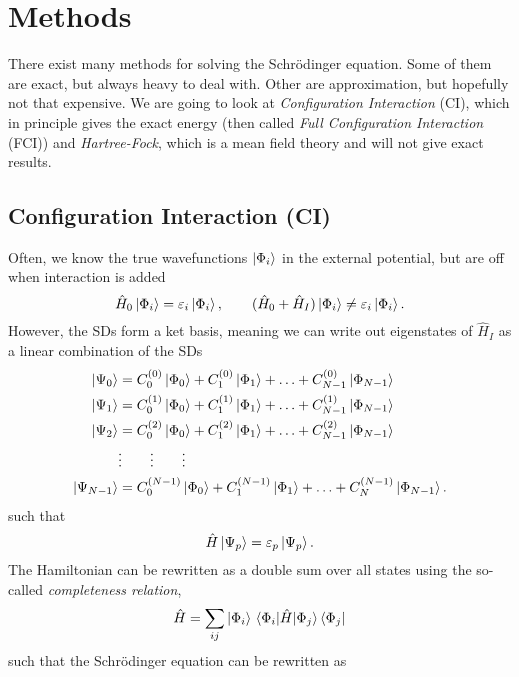 \section{Methods} \label{sec:methods}
There exist many methods for solving the Schr\"odinger equation. Some of them are exact, but always heavy to deal with. Other are approximation, but hopefully not that expensive. We are going to look at \textit{Configuration Interaction} (CI), which in principle gives the exact energy (then called \textit{Full Configuration Interaction }(FCI)) and \textit{Hartree-Fock}, which is a mean field theory and will not give exact results.

\subsection{Configuration Interaction (CI)}
Often, we know the true wavefunctions $\ket{\Phi_i}$ in the external potential, but are off when interaction is added
\begin{equation}
\hat{H}_0\ket{\Phi_i}=\varepsilon_i\ket{\Phi_i},\qquad (\hat{H}_0+\hat{H}_I)\ket{\Phi_i}\neq\varepsilon_i\ket{\Phi_i}.
\end{equation}
However, the SDs form a ket basis, meaning we can write out eigenstates of $\hat{H}_I$ as a linear combination of the SDs
\begin{align}
\ket{\Psi_0}&=C_0^{(0)}\ket{\Phi_0}+C_1^{(0)}\ket{\Phi_1}+\hdots+C_{N-1}^{(0)}\ket{\Phi_{N-1}}\notag\\
\ket{\Psi_1}&=C_0^{(1)}\ket{\Phi_0}+C_1^{(1)}\ket{\Phi_1}+\hdots+C_{N-1}^{(1)}\ket{\Phi_{N-1}}\notag\\
\ket{\Psi_2}&=C_0^{(2)}\ket{\Phi_0}+C_1^{(2)}\ket{\Phi_1}+\hdots+C_{N-1}^{(2)}\ket{\Phi_{N-1}}\\
&\vdots\qquad\vdots\qquad\vdots\notag\\
\ket{\Psi_{N-1}}&=C_0^{(N-1)}\ket{\Phi_0}+C_1^{(N-1)}\ket{\Phi_1}+\hdots+C_N^{(N-1)}\ket{\Phi_{N-1}}.\notag
\end{align}
such that 
\begin{equation}
\hat{H}\ket{\Psi_p}=\varepsilon_p\ket{\Psi_p}.
\end{equation}
The Hamiltonian can be rewritten as a double sum over all states using the so-called \textit{completeness relation}, 
\begin{equation}
\hat{H}=\sum_{ij}\ket{\Phi_i}\mel{\Phi_i}{\hat{H}}{\Phi_j}\bra{\Phi_j}
\end{equation}
such that the Schr\"odinger equation can be rewritten as
